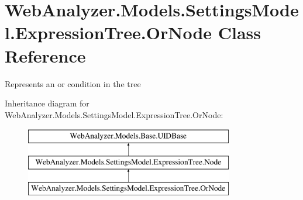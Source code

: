 \hypertarget{class_web_analyzer_1_1_models_1_1_settings_model_1_1_expression_tree_1_1_or_node}{}\section{Web\+Analyzer.\+Models.\+Settings\+Model.\+Expression\+Tree.\+Or\+Node Class Reference}
\label{class_web_analyzer_1_1_models_1_1_settings_model_1_1_expression_tree_1_1_or_node}


Represents an or condition in the tree  


Inheritance diagram for Web\+Analyzer.\+Models.\+Settings\+Model.\+Expression\+Tree.\+Or\+Node\+:\begin{figure}[H]
\begin{center}
\leavevmode
\includegraphics[height=3.000000cm]{class_web_analyzer_1_1_models_1_1_settings_model_1_1_expression_tree_1_1_or_node}
\end{center}
\end{figure}
